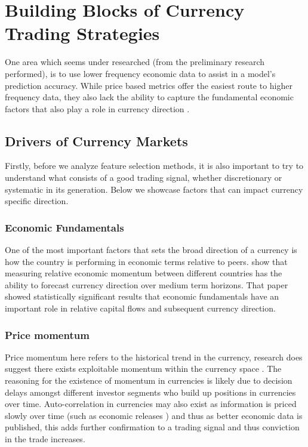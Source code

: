 \documentclass[12pt, a4paper]{article}
\begin{document}
\clearpage
\section{Building Blocks of Currency Trading Strategies}
One area which seems under researched (from the preliminary research performed), is to use lower frequency economic data to assist in a model's prediction accuracy. While price based metrics offer the easiest route to higher frequency data, they also lack the ability to capture the fundamental economic factors that also play a role in currency direction \cite{medium}. 

\subsection{Drivers of Currency Markets}

Firstly, before we analyze feature selection methods, it is also important to try to understand what consists of a good trading signal, whether discretionary or systematic in its generation. Below we showcase factors that can impact currency specific direction.
\subsubsection{Economic Fundamentals}
One of the most important factors that sets the broad direction of a currency is how the country is performing in economic terms relative to peers.
\cite{Dahlquist2015} show that measuring relative economic momentum between different countries has the ability to forecast currency direction over medium term horizons. That paper showed statistically significant results that economic fundamentals have an important role in relative capital flows and subsequent currency direction.
\subsubsection{Price momentum}
Price momentum here refers to the historical trend in the currency,  research does suggest there exists  exploitable momentum within the currency space \cite{Moskowitz2012}. The reasoning for the existence of momentum in currencies is likely due to decision delays amongst different investor segments who build up positions in currencies over time. Auto-correlation in currencies may also exist as information is priced slowly over time (such as economic releases ) and thus as better economic data is published, this adds further confirmation to a trading signal and thus conviction in the trade increases.
\end{document}
